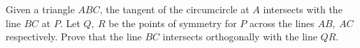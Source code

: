 Given a triangle $ABC$, the tangent of the circumcircle at $A$ intersects with the line $BC$ at $P$. Let $Q,\ R$ be the points of symmetry for $P$ across the lines $AB,\ AC$ respectively. Prove that the line $BC$ intersects orthogonally with the line $QR$.